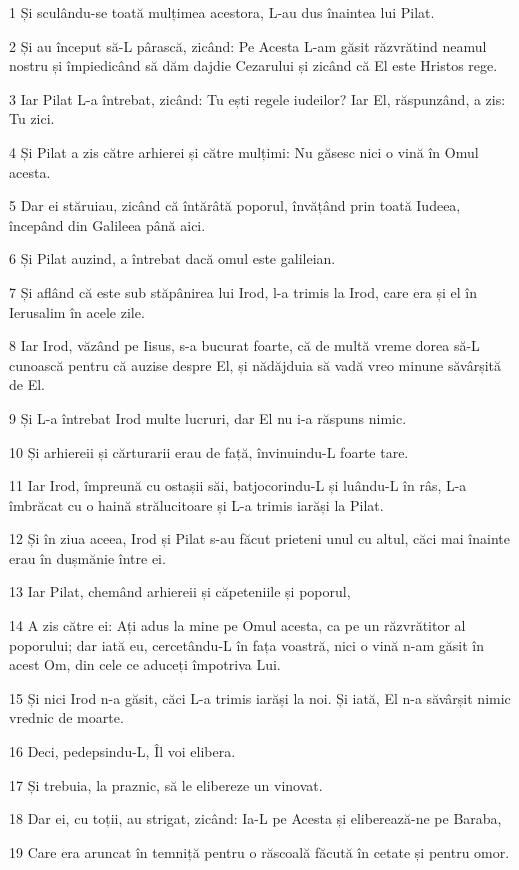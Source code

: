 \par 1 Și sculându-se toată mulțimea acestora, L-au dus înaintea lui Pilat.
\par 2 Și au început să-L pârască, zicând: Pe Acesta L-am găsit răzvrătind neamul nostru și împiedicând să dăm dajdie Cezarului și zicând că El este Hristos rege.
\par 3 Iar Pilat L-a întrebat, zicând: Tu ești regele iudeilor? Iar El, răspunzând, a zis: Tu zici.
\par 4 Și Pilat a zis către arhierei și către mulțimi: Nu găsesc nici o vină în Omul acesta.
\par 5 Dar ei stăruiau, zicând că întărâtă poporul, învățând prin toată Iudeea, începând din Galileea până aici.
\par 6 Și Pilat auzind, a întrebat dacă omul este galileian.
\par 7 Și aflând că este sub stăpânirea lui Irod, l-a trimis la Irod, care era și el în Ierusalim în acele zile.
\par 8 Iar Irod, văzând pe Iisus, s-a bucurat foarte, că de multă vreme dorea să-L cunoască pentru că auzise despre El, și nădăjduia să vadă vreo minune săvârșită de El.
\par 9 Și L-a întrebat Irod multe lucruri, dar El nu i-a răspuns nimic.
\par 10 Și arhiereii și cărturarii erau de față, învinuindu-L foarte tare.
\par 11 Iar Irod, împreună cu ostașii săi, batjocorindu-L și luându-L în râs, L-a îmbrăcat cu o haină strălucitoare și L-a trimis iarăși la Pilat.
\par 12 Și în ziua aceea, Irod și Pilat s-au făcut prieteni unul cu altul, căci mai înainte erau în dușmănie între ei.
\par 13 Iar Pilat, chemând arhiereii și căpeteniile și poporul,
\par 14 A zis către ei: Ați adus la mine pe Omul acesta, ca pe un răzvrătitor al poporului; dar iată eu, cercetându-L în fața voastră, nici o vină n-am găsit în acest Om, din cele ce aduceți împotriva Lui.
\par 15 Și nici Irod n-a găsit, căci L-a trimis iarăși la noi. Și iată, El n-a săvârșit nimic vrednic de moarte.
\par 16 Deci, pedepsindu-L, Îl voi elibera.
\par 17 Și trebuia, la praznic, să le elibereze un vinovat.
\par 18 Dar ei, cu toții, au strigat, zicând: Ia-L pe Acesta și eliberează-ne pe Baraba,
\par 19 Care era aruncat în temniță pentru o răscoală făcută în cetate și pentru omor.
